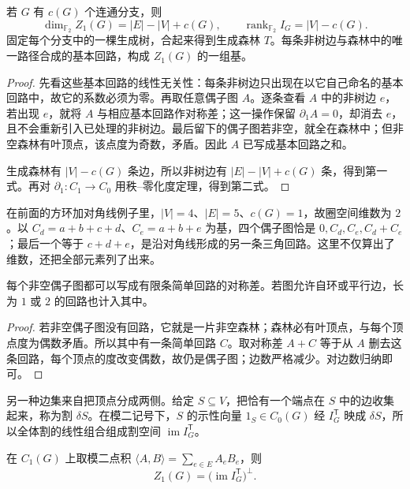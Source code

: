 \begin{theorem}[圈空间的基与维数]
若 $G$ 有 $c(G)$ 个连通分支，则
\begin{equation}
\dim_{\mathbb F_2}Z_1(G)=|E|-|V|+c(G),
\qquad \operatorname{rank}_{\mathbb F_2}I_G=|V|-c(G).
\label{eq:advanced-graph-cycle-rank-primer}
\end{equation}
固定每个分支中的一棵生成树，合起来得到生成森林 $T$。每条非树边与森林中的唯一路径合成的基本回路，构成 $Z_1(G)$ 的一组基。
\end{theorem}

\begin{proof}
先看这些基本回路的线性无关性：每条非树边只出现在以它自己命名的基本回路中，故它的系数必须为零。再取任意偶子图 $A$。逐条查看 $A$ 中的非树边 $e$，若出现 $e$，就将 $A$ 与相应基本回路作对称差；这一操作保留 $\partial_1A=0$，却消去 $e$，且不会重新引入已处理的非树边。最后留下的偶子图若非空，就全在森林中；但非空森林有叶顶点，该点度为奇数，矛盾。因此 $A$ 已写成基本回路之和。

生成森林有 $|V|-c(G)$ 条边，所以非树边有 $|E|-|V|+c(G)$ 条，得到第一式。再对 $\partial_1:C_1\to C_0$ 用秩--零化度定理，得到第二式。
\end{proof}

在前面的方环加对角线例子里，$|V|=4$、$|E|=5$、$c(G)=1$，故圈空间维数为 $2$。以 $C_d=a+b+c+d$、$C_e=a+b+e$ 为基，四个偶子图恰是 $0,C_d,C_e,C_d+C_e$；最后一个等于 $c+d+e$，是沿对角线形成的另一条三角回路。这里不仅算出了维数，还把全部元素列了出来。

\begin{proposition}[偶子图的回路分解]
每个非空偶子图都可以写成有限条简单回路的对称差。若图允许自环或平行边，长为 $1$ 或 $2$ 的回路也计入其中。
\end{proposition}

\begin{proof}
若非空偶子图没有回路，它就是一片非空森林；森林必有叶顶点，与每个顶点度为偶数矛盾。所以其中有一条简单回路 $C$。取对称差 $A+C$ 等于从 $A$ 删去这条回路，每个顶点的度改变偶数，故仍是偶子图；边数严格减少。对边数归纳即可。
\end{proof}

另一种边集来自把顶点分成两侧。给定 $S\subseteq V$，把恰有一个端点在 $S$ 中的边收集起来，称为割 $\delta S$。在模二记号下，$S$ 的示性向量 $1_S\in C_0(G)$ 经 $I_G^{\mathsf T}$ 映成 $\delta S$，所以全体割的线性组合组成割空间 $\operatorname{im}I_G^{\mathsf T}$。

\begin{theorem}[圈与割的正交关系]
在 $C_1(G)$ 上取模二点积 $\langle A,B\rangle=\sum_{e\in E}A_eB_e$，则
\begin{equation}
Z_1(G)=\bigl(\operatorname{im}I_G^{\mathsf T}\bigr)^\perp.
\label{eq:advanced-graph-cycle-cut-primer}
\end{equation}
\end{theorem}

